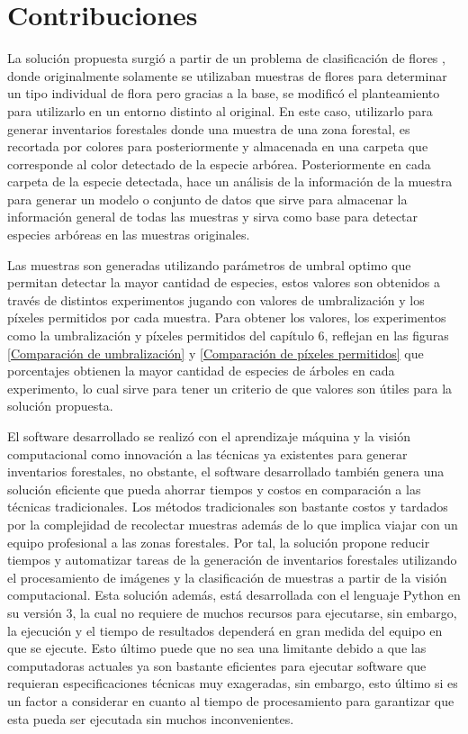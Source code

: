 \section{Contribuciones}
La solución propuesta surgió a partir de un problema de clasificación de flores \citep{rf17},  donde originalmente solamente se utilizaban muestras de flores para determinar un tipo individual de flora pero gracias a la base, se modificó el planteamiento para utilizarlo en un entorno distinto al original. En este caso, utilizarlo para generar inventarios forestales donde una muestra de una zona forestal, es recortada por colores para posteriormente y almacenada en una carpeta que corresponde al color detectado de la especie arbórea. Posteriormente en cada carpeta de la especie detectada, hace un análisis de la información de la muestra para generar un modelo  o conjunto de datos que sirve para almacenar la información general de todas las muestras y sirva como base para detectar especies arbóreas en las muestras originales. 

Las muestras son generadas utilizando parámetros de umbral optimo que permitan detectar la mayor cantidad de especies, estos valores son obtenidos a través de distintos experimentos jugando con valores de umbralización y los píxeles permitidos por cada muestra. Para obtener los valores, los experimentos como la umbralización y píxeles permitidos del capítulo 6, reflejan en las figuras \ref{Comparación de umbralización} y \ref{Comparación de píxeles permitidos} que porcentajes obtienen la mayor cantidad de especies de árboles en cada experimento, lo cual sirve para tener un criterio de que valores son útiles para la solución propuesta.

El software desarrollado se realizó con el aprendizaje máquina y la visión computacional como innovación a las técnicas ya existentes para generar inventarios forestales, no obstante, el software desarrollado también genera una solución eficiente que pueda ahorrar tiempos y costos en comparación a las técnicas tradicionales. Los métodos tradicionales son bastante costos y tardados por la complejidad de recolectar muestras además de lo que implica viajar con un equipo profesional a las zonas forestales. Por tal, la solución propone reducir tiempos y automatizar tareas de la generación de inventarios forestales utilizando el procesamiento de imágenes y la clasificación de muestras a partir de la visión computacional. 
\clearpage
Esta solución además, está desarrollada con el lenguaje Python en su versión 3, la cual no requiere de muchos recursos para ejecutarse, sin embargo, la ejecución y el tiempo de resultados dependerá en gran medida del equipo en que se ejecute. Esto último puede que no sea una limitante debido a que las computadoras actuales ya son bastante eficientes para ejecutar software que requieran especificaciones técnicas muy exageradas, sin embargo, esto último  si es un factor a considerar en cuanto al tiempo de procesamiento para garantizar que esta pueda ser ejecutada sin muchos inconvenientes. 

